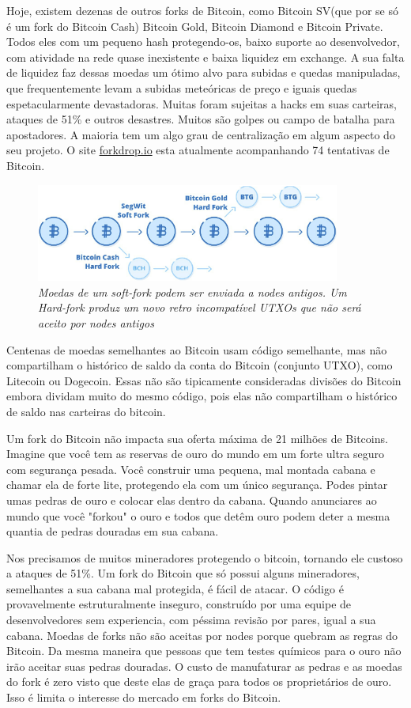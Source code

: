 Hoje, existem dezenas de outros forks de Bitcoin, como Bitcoin SV(que por se só é um fork do Bitcoin Cash) Bitcoin Gold, Bitcoin Diamond e Bitcoin Private. Todos eles com um pequeno hash protegendo-os, baixo suporte ao desenvolvedor, com atividade na rede quase inexistente e baixa liquidez em exchange.
A sua falta de liquidez faz dessas moedas um ótimo alvo para subidas e quedas manipuladas, que frequentemente levam a subidas meteóricas de preço e iguais quedas espetacularmente devastadoras. 
Muitas foram sujeitas a hacks em suas carteiras, ataques de 51\% e outros desastres. 
Muitos são golpes ou campo de batalha para apostadores. 
A maioria tem um algo grau de centralização em algum aspecto do seu projeto. 
O site \url{forkdrop.io} esta atualmente acompanhando 74 tentativas de Bitcoin.

\begin{figure}
    \centering
    \includegraphics[width = 10cm]{imagens/Capitulo8/capitulo8-forks.png}
    \caption*{\textit{\small Moedas de um soft-fork podem ser enviada a nodes antigos. Um Hard-fork produz um novo retro incompatível UTXOs que não será aceito por nodes antigos}}
\end{figure}


Centenas de moedas semelhantes ao Bitcoin usam código semelhante, mas não compartilham o histórico de saldo da conta do Bitcoin (conjunto UTXO), como Litecoin ou Dogecoin.
Essas não são tipicamente consideradas divisões do Bitcoin embora dividam muito do mesmo código, pois elas não compartilham o histórico de saldo nas carteiras do bitcoin.

Um fork do Bitcoin não impacta sua oferta máxima de 21 milhões de Bitcoins. 
Imagine que você tem as reservas de ouro do mundo em um forte ultra seguro com segurança pesada.
Você construir uma pequena, mal montada cabana e chamar ela de forte lite, protegendo ela com um único segurança.
Podes pintar umas pedras de ouro e colocar elas dentro da cabana.
Quando anunciares ao mundo que você "forkou" o ouro e todos que detêm ouro podem deter a mesma quantia de pedras douradas em sua cabana.

Nos precisamos de muitos mineradores protegendo o bitcoin, tornando ele custoso a ataques de 51\%.  
Um fork do Bitcoin que só possui alguns mineradores, semelhantes a sua cabana mal protegida, é fácil de atacar. 
O código é provavelmente estruturalmente inseguro, construído por uma equipe de desenvolvedores sem experiencia, com péssima revisão por pares, igual a sua cabana. 
Moedas de forks não são aceitas por nodes porque quebram as regras do Bitcoin. 
Da mesma maneira que pessoas que tem testes químicos para o ouro não irão aceitar suas pedras douradas.
O custo de manufaturar as pedras e as moedas do fork é zero visto que deste elas de graça para todos os proprietários de ouro. 
Isso é limita o interesse do mercado em forks do Bitcoin.

